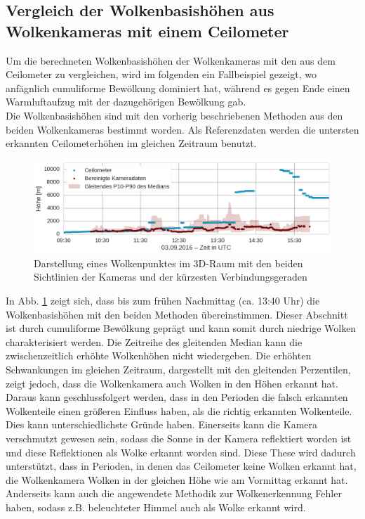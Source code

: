 \documentclass[a4paper,11pt,twoside,german]{article}
\begin{document}
\subsection{Vergleich der Wolkenbasishöhen aus Wolkenkameras mit einem Ceilometer}
\label{SECCeilo}
Um die berechneten Wolkenbasishöhen der Wolkenkameras mit den aus dem Ceilometer zu vergleichen, wird im folgenden ein Fallbeispiel gezeigt, wo anfägnlich cumuliforme Bewölkung dominiert hat, während es gegen Ende einen Warmluftaufzug mit der dazugehörigen Bewölkung gab.\\
Die Wolkenbasishöhen sind mit den vorherig beschriebenen Methoden aus den beiden Wolkenkameras bestimmt worden. Als Referenzdaten werden die untersten erkannten Ceilometerhöhen im gleichen Zeitraum benutzt.\\
\begin{figure}[h]
	\begin{center}
		\includegraphics[width=1\textwidth]{media/ceilo_cam_new.png}
		\caption[Zeitreihenvergleich Wolkenkameras mit Ceilometer]{Darstellung eines Wolkenpunktes im 3D-Raum mit den beiden Sichtlinien der Kameras und der kürzesten Verbindungsgeraden}
		\label{FIGCeilo}
	\end{center}
\end{figure}
In Abb. \ref{FIGCeilo} zeigt sich, dass bis zum frühen Nachmittag (ca. 13:40 Uhr) die Wolkenbasishöhen mit den beiden Methoden übereinstimmen. Dieser Abschnitt ist durch cumuliforme Bewölkung geprägt und kann somit durch niedrige Wolken charakterisiert werden. Die Zeitreihe des gleitenden Median kann die zwischenzeitlich erhöhte Wolkenhöhen nicht wiedergeben. Die erhöhten Schwankungen im gleichen Zeitraum, dargestellt mit den gleitenden Perzentilen, zeigt jedoch, dass die Wolkenkamera auch Wolken in den Höhen erkannt hat. Daraus kann geschlussfolgert werden, dass in den Perioden die falsch erkannten Wolkenteile einen größeren Einfluss haben, als die richtig erkannten Wolkenteile. Dies kann unterschiedlichste Gründe haben. Einerseits kann die Kamera verschmutzt gewesen sein, sodass die Sonne in der Kamera reflektiert worden ist und diese Reflektionen als Wolke erkannt worden sind. Diese These wird dadurch unterstützt, dass in Perioden, in denen das Ceilometer keine Wolken erkannt hat, die Wolkenkamera Wolken in der gleichen Höhe wie am Vormittag erkannt hat. Anderseits kann auch die angewendete Methodik zur Wolkenerkennung Fehler haben, sodass z.B. beleuchteter Himmel auch als Wolke erkannt wird.\\
\end{document}
